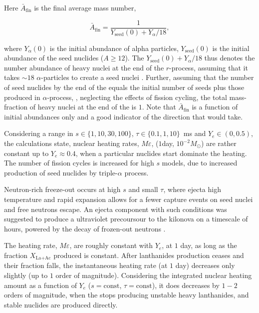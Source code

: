 Here $\bar{A}_{\text{fin}}$ is the final average mass number,

\begin{equation}
\bar{A}_{\text{fin}} = \frac{1}{Y_{\text{seed}}(0) + Y_{\alpha}/18},
\end{equation}

where $Y_{\alpha}(0)$ is the initial abundance of alpha particles, $Y_{\text{seed}}(0)$ is the initial abundance of the seed nuclides ($A\geq12$). The $Y_{\text{seed}}(0) + Y_{\alpha}/18$ thus denotes the number abundance of heavy nuclei at the end of the $r$-process, assuming that it takes $\sim 18$ $\alpha$-particles to create a seed nuclei \cite{Woosley:1992}. Further, assuming that the number of seed nuclides by the end of the \rproc{} equals the initial number of seeds plus those produced in $\alpha$-process, \ie, neglecting the effects of fission cycling, the total mass-fraction of heavy nuclei at the end of the \nuc{} is $1$. Note that $\bar{A}_{\text{fin}}$ is a function of initial abundances only and a good indicator of the direction that \nuc{} would take. 

Considering a range in $s\in\{1, 10, 30, 100 \}$, $\tau\in\{0.1, 1, 10\}$~ms and $Y_e\in(0,0.5)$,
the \nuc{} calculations state, nuclear heating rates, $M\varepsilon$, ($1$day, $10^{-2}M_{\odot}$) are rather constant up to $Y_e\approx 0.4$, when a particular nuclides start dominate the heating. The number of fission cycles is increased for high $s$ models, due to increased production of seed nuclides by triple-$\alpha$ process. 

Neutron-rich freeze-out occurs at high $s$ and small $\tau$, where ejecta high temperature and rapid expansion allows for a fewer capture events on seed nuclei and free neutrons escape. An ejecta component with such conditions was suggested to produce a ultraviolet precoursour to the kilonova on a timescale of hours, powered by the decay of frozen-out neutrons \citep{Metzger:2014yda}.


The heating rate, $M\varepsilon$, are roughly constant with $Y_e$, at $1$ day, as long as the fraction $X_{\text{La+Ac}}$ produced is constant. 
After lanthanides production ceases and their fraction falls, the instantaneous heating rate (at $1$ day) decreases only slightly (up to $1$ order of magnitude). 
Considering the integrated nuclear heating amount as a function of $Y_e$ ($s=\text{const}$, $\tau=\text{const}$), it does decreases by $1-2$ orders of magnitude, when the \rproc{} stops producing unstable heavy lanthanides, and stable nuclides are produced directly.


